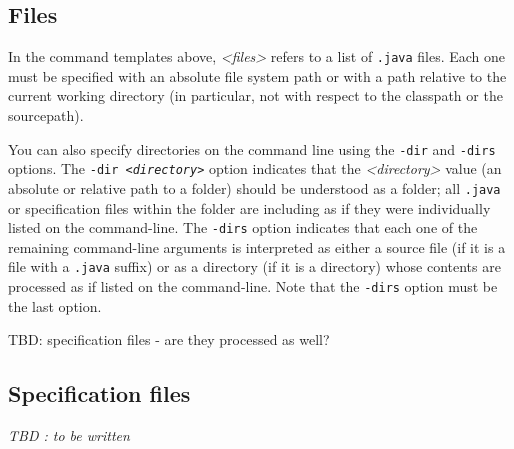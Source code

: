 \documentclass{report}%
\begin{document}
\subsection{Files}

In the command templates above, {\it <files>} refers to a list of {\tt .java} files.
Each one must be specified with an absolute file system path or with a path relative
to the current working directory (in particular, not with respect to the classpath or
the sourcepath). 

You can also specify directories on the command line using the {\tt -dir} and {\tt -dirs} options.
The {\tt -dir {\it <directory>}} option indicates that the {\it <directory>} value (an absolute or
relative path to a folder) should be understood as a folder; all {\tt .java} or specification files
within the folder are including as if they were individually listed on the command-line. The
{\tt -dirs} option indicates that each one of the remaining command-line arguments is interpreted as 
either a source file (if it is a file with a {\tt .java} suffix) or as a directory (if it is a directory)
whose contents are processed as if listed on the command-line. Note that the {\tt -dirs} option must be
the last option.

TBD: specification files - are they processed as well?

\subsection{Specification files}

{\it TBD : to be written}
\end{document}
